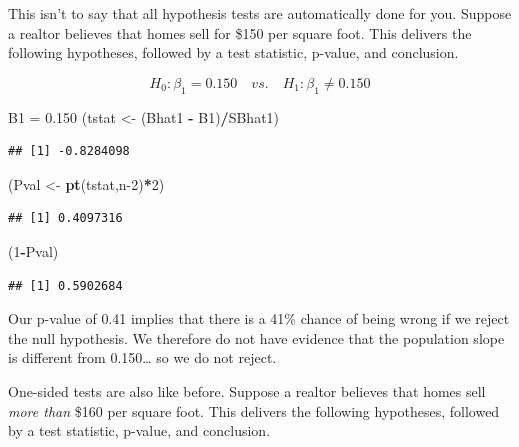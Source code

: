 \documentclass[
]{book}
\newenvironment{Shaded}{\begin{snugshade}}{\end{snugshade}}
\newcommand{\DecValTok}[1]{\textcolor[rgb]{0.00,0.00,0.81}{#1}}
\newcommand{\FloatTok}[1]{\textcolor[rgb]{0.00,0.00,0.81}{#1}}
\newcommand{\FunctionTok}[1]{\textcolor[rgb]{0.13,0.29,0.53}{\textbf{#1}}}
\newcommand{\NormalTok}[1]{#1}
\newcommand{\OtherTok}[1]{\textcolor[rgb]{0.56,0.35,0.01}{#1}}
\newcommand{\SpecialCharTok}[1]{\textcolor[rgb]{0.81,0.36,0.00}{\textbf{#1}}}
\begin{document}
This isn't to say that all hypothesis tests are automatically done for you. Suppose a realtor believes that homes sell for \$150 per square foot. This delivers the following hypotheses, followed by a test statistic, p-value, and conclusion.

\[H_0:\beta_1=0.150 \quad vs. \quad H_1:\beta_1\neq0.150\]

\begin{Shaded}
\begin{Highlighting}[]
\NormalTok{B1 }\OtherTok{=} \FloatTok{0.150}
\NormalTok{(tstat }\OtherTok{\textless{}{-}}\NormalTok{ (Bhat1 }\SpecialCharTok{{-}}\NormalTok{ B1)}\SpecialCharTok{/}\NormalTok{SBhat1)}
\end{Highlighting}
\end{Shaded}

\begin{verbatim}
## [1] -0.8284098
\end{verbatim}

\begin{Shaded}
\begin{Highlighting}[]
\NormalTok{(Pval }\OtherTok{\textless{}{-}} \FunctionTok{pt}\NormalTok{(tstat,n}\DecValTok{{-}2}\NormalTok{)}\SpecialCharTok{*}\DecValTok{2}\NormalTok{)}
\end{Highlighting}
\end{Shaded}

\begin{verbatim}
## [1] 0.4097316
\end{verbatim}

\begin{Shaded}
\begin{Highlighting}[]
\NormalTok{(}\DecValTok{1}\SpecialCharTok{{-}}\NormalTok{Pval)}
\end{Highlighting}
\end{Shaded}

\begin{verbatim}
## [1] 0.5902684
\end{verbatim}

Our p-value of 0.41 implies that there is a 41\% chance of being wrong if we reject the null hypothesis. We therefore do not have evidence that the population slope is different from 0.150\ldots{} so we do not reject.

One-sided tests are also like before. Suppose a realtor believes that homes sell \emph{more than} \$160 per square foot. This delivers the following hypotheses, followed by a test statistic, p-value, and conclusion.
\end{document}
